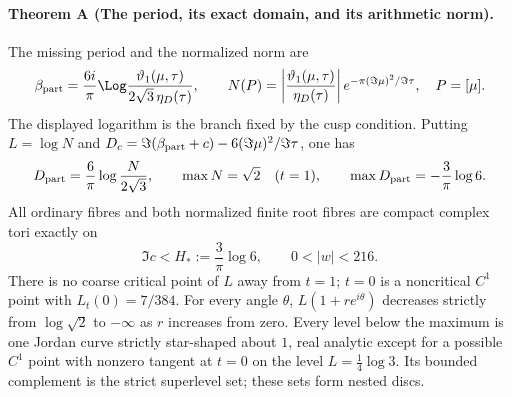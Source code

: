 \paragraph{Theorem A (The period, its exact domain, and its arithmetic norm).}
\label{series:I:A}
The missing period and the normalized norm are
\[
 \beta_{\rm part}=\frac{6i}{\pi}\Log
 \frac{\vartheta_1(\mu,\tau)}{2\sqrt3\,\eta_D(\tau)},
 \qquad
 N(P)=\left|\frac{\vartheta_1(\mu,\tau)}{\eta_D(\tau)}\right|
           e^{-\pi(\Im\mu)^2/\Im\tau},
 \quad P=[\mu].
\]
The displayed logarithm is the branch fixed by the cusp condition.
Putting $L=\log N$ and
$D_c=\Im(\beta_{\rm part}+c)-6(\Im\mu)^2/\Im\tau$, one has
\[
 D_{
 \rm part}=\frac6\pi\log\frac{N}{2\sqrt3},\qquad
 \max N=\sqrt2\quad(t=1),\qquad
 \max D_{\rm part}=-\frac3\pi\log6.
\]
All ordinary fibres and both normalized finite root fibres are
compact complex tori exactly on
\[
 \Im c<H_*:=\frac3\pi\log6,
 \qquad 0<|w|<216.
\]
There is no coarse critical point of $L$ away from $t=1$;
$t=0$ is a noncritical $C^1$ point with $L_t(0)=7/384$.
For every angle $\theta$, $L(1+re^{i\theta})$ decreases strictly
from $\log\sqrt2$ to $-\infty$ as $r$ increases from zero.
Every level below the maximum is one Jordan curve strictly
star-shaped about $1$, real analytic except for a possible
$C^1$ point with nonzero tangent at $t=0$ on the level
$L=\tfrac14\log3$.  Its bounded complement is the strict
superlevel set; these sets form nested discs.

